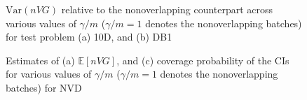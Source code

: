 \documentclass[12pt]{article}
\newcommand{\e}[1]{\mathbb{E} \left[ #1 \right]
}
\newcommand{\var}[1]{\mathrm{Var} \left( #1 \right)}
\begin{document}
\begin{figure}[htb!]
	\centering
		\caption{
		$\var{n VG}$ relative to the nonoverlapping counterpart across various values of $\gamma/m$ ($\gamma/m=1$ denotes the nonoverlapping batches) for test problem
		(a) 10D, and
		(b) DB1
		}
\label{fig:varvar2}
\end{figure}


\begin{figure}[htb!]
	\centering
	\caption{ 
		Estimates of
		(a) $\e{nVG}$, and 
		(c) coverage probability of the CIs for various values of $\gamma/m$ ($\gamma/m=1$ denotes the nonoverlapping batches)
		 for NVD
	}
\label{fig:nv}
\end{figure}
\end{document}
